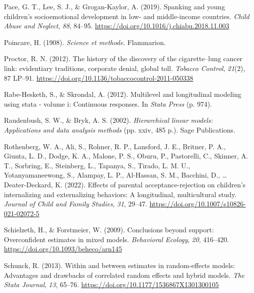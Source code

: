 \documentclass[
  letterpaper,
  DIV=11,
  numbers=noendperiod]{scrreprt}
\newlength{\cslhangindent}
\newlength{\cslentryspacingunit} %
\newenvironment{CSLReferences}[2] %
 {%
  \setlength{\parindent}{0pt}
  \ifodd #1
  \let\oldpar\par
  \def\par{\hangindent=\cslhangindent\oldpar}
  \fi
  \setlength{\parskip}{#2\cslentryspacingunit}
 }%
 {}
\begin{document}
\begin{CSLReferences}{1}{0}
\leavevmode{}%
Pace, G. T., Lee, S. J., \& Grogan-Kaylor, A. (2019). {Spanking and
young children's socioemotional development in low- and middle-income
countries}. \emph{Child Abuse and Neglect}, \emph{88}, 84--95.
\url{https://doi.org/10.1016/j.chiabu.2018.11.003}

\leavevmode{}%
Poincare, H. (1908). \emph{Science et methode}. Flammarion.

\leavevmode{}%
Proctor, R. N. (2012). {The history of the discovery of the
cigarette--lung cancer link: evidentiary traditions, corporate denial,
global toll}. \emph{Tobacco Control}, \emph{21}(2), 87 LP--91.
\url{https://doi.org/10.1136/tobaccocontrol-2011-050338}

\leavevmode{}%
Rabe-Hesketh, S., \& Skrondal, A. (2012). Multilevel and longitudinal
modeling using stata - volume i: Continuous responses. In \emph{Stata
Press} (p. 974).

\leavevmode{}%
Raudenbush, S. W., \& Bryk, A. S. (2002). \emph{Hierarchical linear
models: Applications and data analysis methods} (pp. xxiv, 485 p.). Sage
Publications.

\leavevmode{}%
Rothenberg, W. A., Ali, S., Rohner, R. P., Lansford, J. E., Britner, P.
A., Giunta, L. D., Dodge, K. A., Malone, P. S., Oburu, P., Pastorelli,
C., Skinner, A. T., Sorbring, E., Steinberg, L., Tapanya, S., Tirado, L.
M. U., Yotanyamaneewong, S., Alampay, L. P., Al-Hassan, S. M., Bacchini,
D., \ldots{} Deater-Deckard, K. (2022). Effects of parental
acceptance-rejection on children's internalizing and externalizing
behaviors: A longitudinal, multicultural study. \emph{Journal of Child
and Family Studies}, \emph{31}, 29--47.
\url{https://doi.org/10.1007/s10826-021-02072-5}

\leavevmode{}%
Schielzeth, H., \& Forstmeier, W. (2009). Conclusions beyond support:
Overconfident estimates in mixed models. \emph{Behavioral Ecology},
\emph{20}, 416--420. \url{https://doi.org/10.1093/beheco/arn145}

\leavevmode{}%
Schunck, R. (2013). Within and between estimates in random-effects
models: Advantages and drawbacks of correlated random effects and hybrid
models. \emph{The Stata Journal}, \emph{13}, 65--76.
\url{https://doi.org/10.1177/1536867X1301300105}


\end{CSLReferences}
\end{document}
